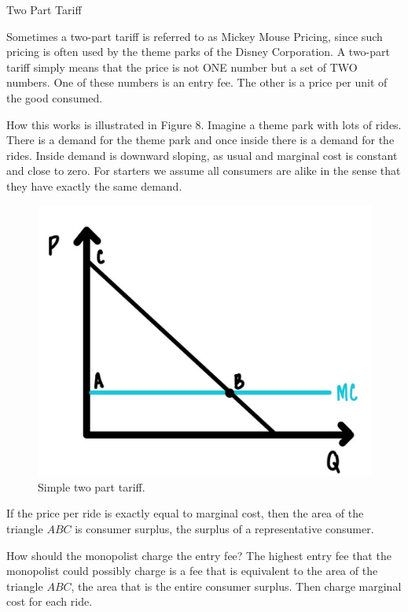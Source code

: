 \documentclass[
]{book}
\begin{document}
\begin{center}
Two Part Tariff

\end{center}

Sometimes a two-part tariff is referred to as Mickey Mouse Pricing, since such pricing is often used by the theme parks of the Disney Corporation. A two-part tariff simply means that the price is not ONE number but a set of TWO numbers. One of these numbers is an entry fee. The other is a price per unit of the good consumed.

How this works is illustrated in Figure 8. Imagine a theme park with lots of rides. There is a demand for the theme park and once inside there is a demand for the rides. Inside demand is downward sloping, as usual and marginal cost is constant and close to zero. For starters we assume all consumers are alike in the sense that they have exactly the same demand.

\begin{figure}

{\centering \includegraphics[width=0.75\linewidth]{img/monopoly/fig9} 

}

\caption{Simple two part tariff.}\label{fig:monopoly09}
\end{figure}

If the price per ride is exactly equal to marginal cost, then the area of the triangle \(ABC\) is consumer surplus, the surplus of a representative consumer.

How should the monopolist charge the entry fee? The highest entry fee that the monopolist could possibly charge is a fee that is equivalent to the area of the triangle \(ABC\), the area that is the entire consumer surplus. Then charge marginal cost for each ride.
\end{document}
